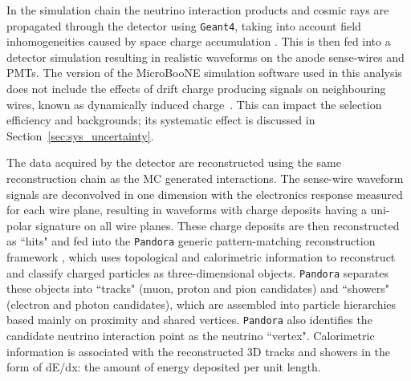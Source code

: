 \documentclass[%
 reprint,
 twocolumn,
superscriptaddress,
showpacs,preprintnumbers,
 amsmath,amssymb,
 aps,
prd,
longbibliography
]{revtex4-1}
\begin{document}
In the simulation chain the neutrino interaction products and cosmic rays are propagated through the detector using \texttt{Geant4}, taking into account field inhomogeneities caused by space charge accumulation \cite{Abratenko_2020}. This is then fed into a detector simulation resulting in realistic waveforms on the anode sense-wires and PMTs. The version of the MicroBooNE simulation software used in this analysis does not include the effects of drift charge producing signals on neighbouring wires, known as dynamically induced charge~\cite{signal_process_part1,signal_process_part2}. This can impact the selection efficiency and backgrounds; its systematic effect is discussed in Section~\ref{sec:sys_uncertainty}. 


The data acquired by the detector are reconstructed using the same reconstruction chain as the MC generated interactions. The sense-wire waveform signals are deconvolved in one dimension with the electronics response measured for each wire plane, resulting in waveforms with charge deposits having a uni-polar signature on all wire planes. 
These charge deposits are then reconstructed as ``hits" and fed into the \texttt{Pandora} generic pattern-matching reconstruction framework \cite{pandora_uboone}, which uses topological and calorimetric information to reconstruct and classify charged particles as three-dimensional objects. \texttt{Pandora} separates these objects into ``tracks" (muon, proton and pion candidates) and ``showers" (electron and photon candidates), which are assembled into particle hierarchies based mainly on proximity and shared vertices. \texttt{Pandora} also identifies the candidate neutrino interaction point as the neutrino ``vertex". Calorimetric information is associated with the reconstructed 3D tracks and showers in the form of dE/dx: the amount of energy deposited per unit length.
\end{document}
